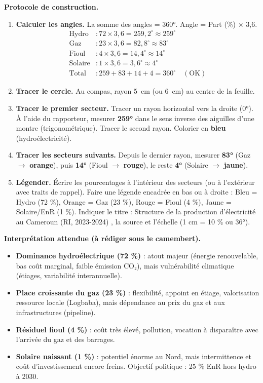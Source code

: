 \documentclass[11pt]{article}
\begin{document}
\begin{experience}
\textbf{Protocole de construction.}
\begin{enumerate}
\item \textbf{Calculer les angles.} La somme des angles = 360°. Angle = Part (\%) $\times$ 3,6.
      \begin{align*}
      \text{Hydro} &: 72 \times 3,6 = 259,2^\circ \approx 259^\circ \\
      \text{Gaz}   &: 23 \times 3,6 = 82,8^\circ \approx 83^\circ \\
      \text{Fioul} &: 4 \times 3,6 = 14,4^\circ \approx 14^\circ \\
      \text{Solaire} &: 1 \times 3,6 = 3,6^\circ \approx 4^\circ \\
      \text{Total} &: 259 + 83 + 14 + 4 = 360^\circ \quad (\text{OK})
      \end{align*}
\item \textbf{Tracer le cercle.} Au compas, rayon \SI{5}{cm} (ou \SI{6}{cm}) au centre de la feuille.
\item \textbf{Tracer le premier secteur.} Tracer un rayon horizontal vers la droite (0°). À l'aide du rapporteur, mesurer \textbf{259°} dans le sens inverse des aiguilles d'une montre (trigonométrique). Tracer le second rayon. Colorier en \textbf{bleu} (hydroélectricité).
\item \textbf{Tracer les secteurs suivants.} Depuis le dernier rayon, mesurer \textbf{83°} (Gaz $\rightarrow$ \textbf{orange}), puis \textbf{14°} (Fioul $\rightarrow$ \textbf{rouge}), le reste \textbf{4°} (Solaire $\rightarrow$ \textbf{jaune}).
\item \textbf{Légender.} Écrire les pourcentages à l'intérieur des secteurs (ou à l'extérieur avec traits de rappel). Faire une légende encadrée en bas ou à droite : Bleu = Hydro (72 \%), Orange = Gaz (23 \%), Rouge = Fioul (4 \%), Jaune = Solaire/EnR (1 \%). Indiquer le titre : \og Structure de la production d'électricité au Cameroun (RI, 2023-2024) \fg, la source et l'échelle (1 cm = 10 \% ou 36°).
\end{enumerate}

\textbf{Interprétation attendue (à rédiger sous le camembert).}
\begin{itemize}
\item \textbf{Dominance hydroélectrique (72 \%)} : atout majeur (énergie renouvelable, bas coût marginal, faible émission CO₂), mais vulnérabilité climatique (étiages, variabilité interannuelle).
\item \textbf{Place croissante du gaz (23 \%)} : flexibilité, appoint en étiage, valorisation ressource locale (Logbaba), mais dépendance au prix du gaz et aux infrastructures (pipeline).
\item \textbf{Résiduel fioul (4 \%)} : coût très élevé, pollution, vocation à disparaître avec l'arrivée du gaz et des barrages.
\item \textbf{Solaire naissant (1 \%)} : potentiel énorme au Nord, mais intermittence et coût d'investissement encore freins. Objectif politique : 25 \% EnR hors hydro à 2030.
\end{itemize}

\end{experience}
\end{document}

